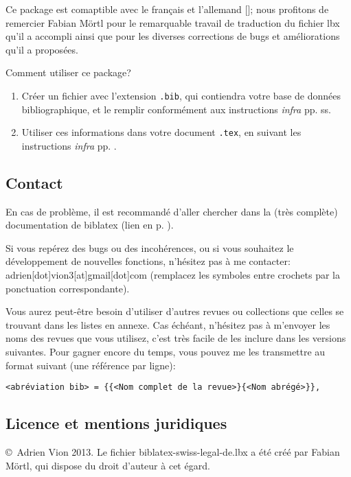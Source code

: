\documentclass[a4paper]{ltxdockit}[2011/03/25]
\renewcommand{\tex}{\texttt{.tex}\xspace}
\newcommand{\bib}{\texttt{.bib}\xspace}
\newcommand{\infra}{\emph{infra}\xspace}
\begin{document}
Ce package est comaptible avec le français et l'allemand [\nXItwo]; nous profitons de remercier Fabian Mörtl pour le remarquable travail de traduction du fichier lbx qu'il a accompli ainsi que pour les diverses corrections de bugs et améliorations qu'il a proposées.

Comment utiliser ce package?
\begin{enumerate}
\item Créer un fichier avec l'extension \bib, qui contiendra votre base de données bibliographique, et le remplir conformément aux instructions \infra pp. \pageref{bib} ss.
\item Utiliser ces informations dans votre document \tex, en suivant les instructions \infra pp. \pageref{tex}.
\end{enumerate}

\subsection{Contact}

En cas de problème, il est recommandé d'aller chercher dans la (très complète) documentation de biblatex (lien en p. \pageref{bibliography}).

Si vous repérez des bugs ou des incohérences, ou si vous souhaitez le développement de nouvelles fonctions, n'hésitez pas à me contacter: adrien[dot]vion3[at]gmail[dot]com (remplacez les symboles entre crochets par la ponctuation correspondante).

Vous aurez peut-être besoin d'utiliser d'autres revues ou collections que celles se trouvant dans les listes en annexe. Cas échéant, n'hésitez pas à m'envoyer les noms des revues que vous utilisez, c'est très facile de les inclure dans les versions suivantes. Pour gagner encore du temps, vous pouvez me les transmettre au format suivant (une référence par ligne):

\begin{verbatim}
<abréviation bib> = {{<Nom complet de la revue>}{<Nom abrégé>}},
\end{verbatim}

\subsection{Licence et mentions juridiques}

\copyright~Adrien Vion 2013. Le fichier biblatex-swiss-legal-de.lbx a été créé par Fabian Mörtl, qui dispose du droit d'auteur à cet égard.
\end{document}
